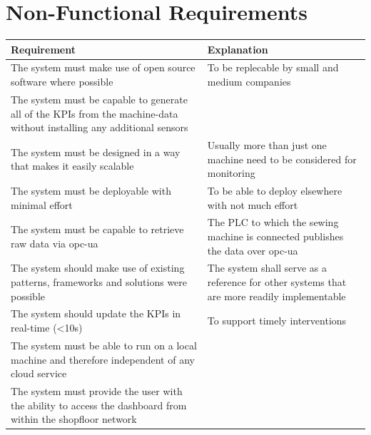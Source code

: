 \section{Non-Functional Requirements} %
\begin{tabularx}{\textwidth}{|X|X|}
	\hline
\textbf{Requirement}	&  \textbf{Explanation}\\
	\hline
The system must make use of open source software where possible	&  To be replecable by small and medium companies\\
	\hline
The system must be capable to generate all of the KPIs from the machine-data without installing any additional sensors	&  \\
	\hline
The system must be designed in a way that makes it easily scalable	&  Usually more than just one machine need to be considered for monitoring\\
	\hline
The system must be deployable with minimal effort	&  To be able to deploy elsewhere with not much effort \\
	\hline
The system must be capable to retrieve raw data via opc-ua	&  The PLC to which the sewing machine is connected publishes the data over opc-ua\\
	\hline
The system should make use of existing patterns, frameworks and solutions were possible	&  The system shall serve as a reference for other systems that are more readily implementable\\
	\hline
The system should update the KPIs in real-time (<10s)	&  To support timely interventions\\
	\hline
 The system must be able to run on a local machine and therefore independent of any cloud service	&  \\
	\hline
The system must provide the user with the ability to access the dashboard from within the shopfloor network	&  \\
	\hline
\end{tabularx}

